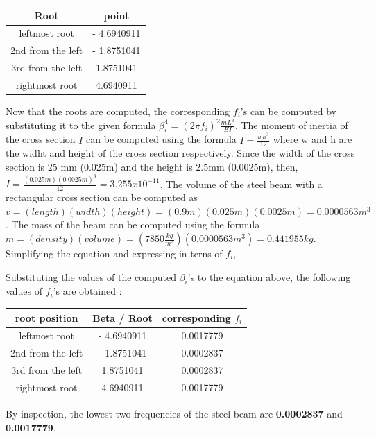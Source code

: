 \documentclass[a4paper]{article}
\newcommand{\head}[1]{\textnormal{\textbf{#1}}}
\begin{document}
\begin{center}
			\begin{tabular}{c c}
				\hline
				\head{Root} & \head{point}\\
				\hline
				leftmost root & - 4.6940911 \\
				2nd from the left & - 1.8751041\\
				3rd from the left & 1.8751041   \\
				rightmost root & 4.6940911\\
				\hline
			\end{tabular}
\end{center}

Now that the roots are computed, the corresponding $f_{i}$'s can be computed by substituting it to the given formula  $\beta_{i}^{4} = (2\pi f_{i})^{2} \frac{mL^{3}}{EI}$. The moment of inertia of the cross section $I$ can be computed using the formula $I = \frac{wh^{3}}{12}$ where w and h are the widht and height of the cross section respectively. Since the width of the cross section is 25 mm (0.025m)  and the height is 2.5mm (0.0025m), then, $I = \frac{(0.025 m)(0.0025 m)^{3}}{12} = 3.255 x 10^{-11}$. The volume of the steel beam with a rectangular cross section can be computed as $v =(length)(width)(height) = (0.9m)(0.025 m)(0.0025 m) = 0.0000563 m^{3}$.  The mass of the beam can be computed using the formula $m = (density)(volume) = (7850 \frac{kg}{m^{3}})(0.0000563 m^{3}) = 0.441955 kg.$ Simplifying the equation and expressing in terns of $f_{i}$,

\begin{center}





\end{center}

Substituting the values of the computed $\beta_{i}$'s to the equation above, the following values of  $f_{i}$'s are obtained :

\begin{center}
			\begin{tabular}{c c c}
				\hline
				\head{root position } & \head{Beta / Root}  & \head{corresponding $f_{i}$}\\
				\hline
				leftmost root & - 4.6940911 & 0.0017779 \\
				2nd from the left & - 1.8751041 & 0.0002837 \\
				3rd from the left & 1.8751041 & 0.0002837    \\
				rightmost root & 4.6940911 & 0.0017779\\
				\hline
			\end{tabular}
\end{center}

By inspection, the lowest two frequencies of the steel beam are \textbf{ 0.0002837} and \textbf{0.0017779}. 

	
\end{document}
